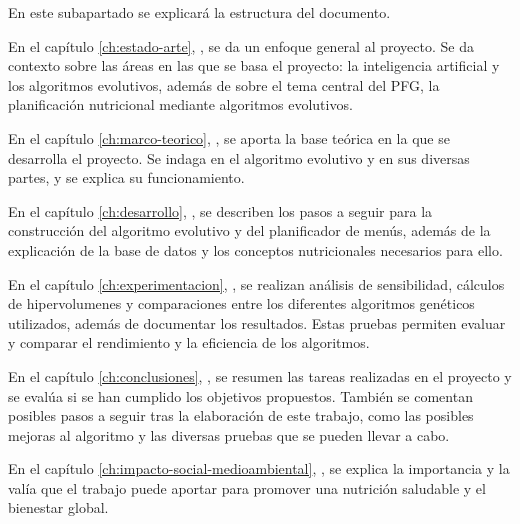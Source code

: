 En este subapartado se explicará la estructura del documento.

En el capítulo \ref{ch:estado-arte}, , se da un enfoque general al proyecto. Se da contexto sobre las áreas en las que se basa el proyecto: la inteligencia artificial y los algoritmos evolutivos, además de sobre el tema central del PFG, la planificación nutricional mediante algoritmos evolutivos.

En el capítulo \ref{ch:marco-teorico}, , se aporta la base teórica en la que se desarrolla el proyecto. Se indaga en el algoritmo evolutivo y en sus diversas partes, y se explica su funcionamiento.

En el capítulo \ref{ch:desarrollo}, , se describen los pasos a seguir para la construcción del algoritmo evolutivo y del planificador de menús, además de la explicación de la base de datos y los conceptos nutricionales necesarios para ello.

En el capítulo \ref{ch:experimentacion}, , se realizan análisis de sensibilidad, cálculos de hipervolumenes y comparaciones entre los diferentes algoritmos genéticos utilizados, además de documentar los resultados. Estas pruebas permiten evaluar y comparar el rendimiento y la eficiencia de los algoritmos.

En el capítulo \ref{ch:conclusiones}, , se resumen las tareas realizadas en el proyecto y se evalúa si se han cumplido los objetivos propuestos. También se comentan posibles pasos a seguir tras la elaboración de este trabajo, como las posibles mejoras al algoritmo y las diversas pruebas que se pueden llevar a cabo.

En el capítulo \ref{ch:impacto-social-medioambiental}, , se explica la importancia y la valía que el trabajo puede aportar para promover una nutrición saludable y el bienestar global. 